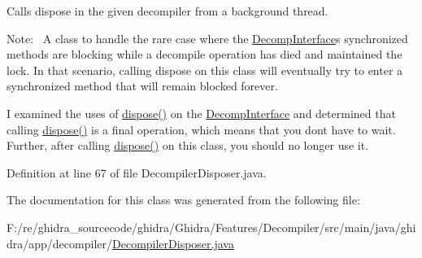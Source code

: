 Calls dispose in the given decompiler from a background thread. 

Note\+:~\newline
 A class to handle the rare case where the \mbox{\hyperlink{classghidra_1_1app_1_1decompiler_1_1_decomp_interface}{Decomp\+Interface}}\textquotesingle{}s synchronized methods are blocking while a decompile operation has died and maintained the lock. In that scenario, calling dispose on this class will eventually try to enter a synchronized method that will remain blocked forever. 

I examined the uses of \mbox{\hyperlink{classghidra_1_1app_1_1decompiler_1_1_decompiler_disposer_ab905d5a11a054fb5df7b96b15e45ccc5}{dispose()}} on the \mbox{\hyperlink{classghidra_1_1app_1_1decompiler_1_1_decomp_interface}{Decomp\+Interface}} and determined that calling \mbox{\hyperlink{classghidra_1_1app_1_1decompiler_1_1_decompiler_disposer_ab905d5a11a054fb5df7b96b15e45ccc5}{dispose()}} is a final operation, which means that you don\textquotesingle{}t have to wait. Further, after calling \mbox{\hyperlink{classghidra_1_1app_1_1decompiler_1_1_decompiler_disposer_ab905d5a11a054fb5df7b96b15e45ccc5}{dispose()}} on this class, you should no longer use it. 

Definition at line 67 of file Decompiler\+Disposer.\+java.



The documentation for this class was generated from the following file\+:\begin{DoxyCompactItemize}
\item 
F\+:/re/ghidra\+\_\+sourcecode/ghidra/\+Ghidra/\+Features/\+Decompiler/src/main/java/ghidra/app/decompiler/\mbox{\hyperlink{_decompiler_disposer_8java}{Decompiler\+Disposer.\+java}}\end{DoxyCompactItemize}
